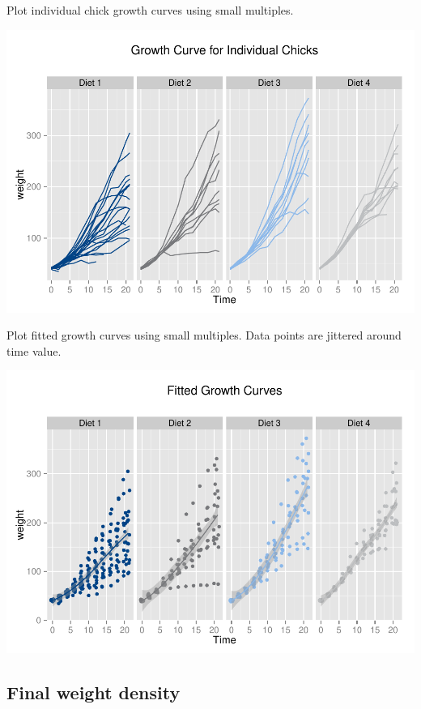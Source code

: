 \documentclass[10pt]{article}
\newenvironment{CodeChunk}{}{}
\begin{document}
Plot individual chick growth curves using small multiples.

\begin{CodeChunk}

\includegraphics{Reproducible_Research_Demo_for_PLoS_files/figure-latex/unnamed-chunk-9-1} \end{CodeChunk}

Plot fitted growth curves using small multiples. Data points are
jittered around time value.

\begin{CodeChunk}

\includegraphics{Reproducible_Research_Demo_for_PLoS_files/figure-latex/unnamed-chunk-10-1} \end{CodeChunk}

\subsection*{Final weight density}\label{final-weight-density}
\end{document}

